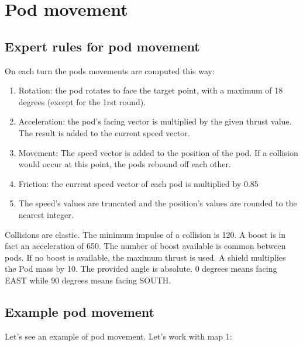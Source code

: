 \documentclass[main.tex]{subfiles}
\begin{document}
\section{Pod movement}

\subsection{Expert rules for pod movement}

On each turn the pods movements are computed this way:
\begin{enumerate}
\item Rotation: the pod rotates to face the target point, with a maximum of 18 degrees (except for the 1rst round).
\item Acceleration: the pod's facing vector is multiplied by the given thrust value. The result is added to the current speed vector.
\item Movement: The speed vector is added to the position of the pod. If a collision would occur at this point, the pods rebound off each other.
\item Friction: the current speed vector of each pod is multiplied by 0.85
\item The speed's values are truncated and the position's values are rounded to the nearest integer.
\end{enumerate}

\par
Collisions are elastic. The minimum impulse of a collision is 120.
A boost is in fact an acceleration of 650. The number of boost available is common between pods.
If no boost is available, the maximum thrust is used.
A shield multiplies the Pod mass by 10.
The provided angle is absolute. 0 degrees means facing EAST while 90 degrees means facing SOUTH.

\newcommand{\cpx}[1]{\checkpoints[0][#1][0]}
\newcommand{\cpy}[1]{\checkpoints[0][#1][1]}

\subsection{Example pod movement}

\par
Let's see an example of pod movement. Let's work with map 1:

\begin{center}
\captionsetup{hypcap=false}
\label{exmap}%
\end{center}
\end{document}
